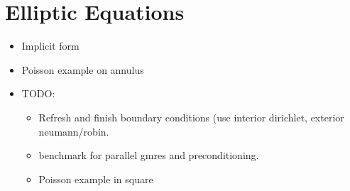 \chapter{Elliptic Equations}

\begin{itemize} 
\item Implicit form
\item Poisson example on annulus
\item TODO: 
    \begin{itemize}
    \item Refresh and finish boundary conditions (use interior dirichlet, exterior neumann/robin. 
    \item benchmark for parallel gmres and preconditioning. 
    \item Poisson example in square
    \end{itemize} 
\end{itemize} 
